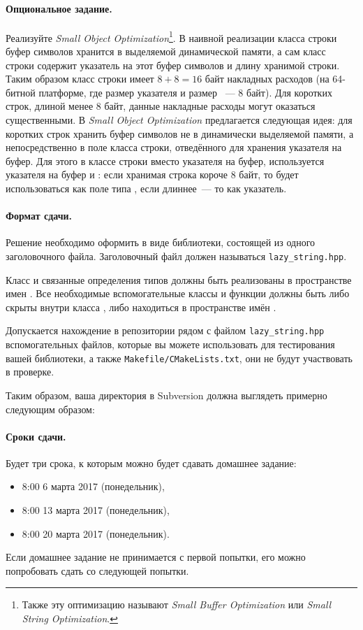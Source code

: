 \documentclass[a4paper,10pt]{article}
\begin{document}
\paragraph{Опциональное задание.}
Реализуйте {\it Small Object Optimization}\footnote{Также эту оптимизацию называют {\it Small Buffer Optimization} или {\it Small String Optimization}.}.
В наивной реализации класса строки буфер символов хранится в выделяемой динамической памяти, а сам класс строки содержит указатель на этот буфер символов и длину хранимой строки.
Таким образом класс строки имеет $8 + 8 = 16$ байт накладных расходов (на 64-битной платформе, где размер указателя и размер ~--- 8 байт).
Для коротких строк, длиной менее 8 байт, данные накладные расходы могут оказаться существенными.
В {\it Small Object Optimization} предлагается следующая идея:
для коротких строк хранить буфер символов не в динамически выделяемой памяти,
а непосредственно в поле класса строки, отведённого для хранения указателя на буфер.
Для этого в классе строки вместо указателя на буфер,
используется  указателя на буфер и :
если хранимая строка короче 8 байт,
то  будет использоваться как поле типа ,
если длиннее~--- то как указатель.

\paragraph{Формат сдачи.}
Решение необходимо оформить в виде библиотеки, состоящей из одного заголовочного файла.
Заголовочный файл должен называться {\tt lazy\_string.hpp}.

Класс  и связанные определения типов должны быть реализованы в пространстве имен .
Все необходимые вспомогательные классы и функции должны быть либо скрыты внутри класса , либо находиться в пространстве имён .

Допускается нахождение в репозитории рядом с файлом {\tt lazy\_string.hpp} вспомогательных файлов, которые вы можете использовать для тестирования вашей библиотеки, а также {\tt Makefile/CMakeLists.txt}, они не будут участвовать в проверке.

Таким образом, ваша директория в Subversion должна выглядеть примерно следующим образом:

\paragraph{Сроки сдачи.}
Будет три срока, к которым можно будет сдавать домашнее задание:
\begin{itemize}
    \item 8:00 6 марта 2017 (понедельник),
    \item 8:00 13 марта 2017 (понедельник),
    \item 8:00 20 марта 2017 (понедельник).
\end{itemize}
Если домашнее задание не принимается с первой попытки, его
можно попробовать сдать со следующей попытки.
\end{document}
